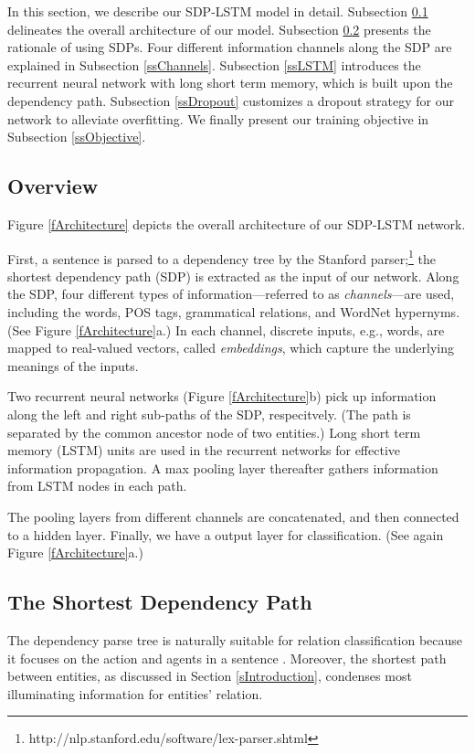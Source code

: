 \documentclass[11pt,a4paper]{article}
\begin{document}
In this section, we describe our SDP-LSTM model in detail.
Subsection \ref{ssOverview} delineates the overall architecture
of our model.
Subsection \ref{ssSDP} presents the rationale of using SDPs.
Four different information channels along
the SDP are explained in Subsection \ref{ssChannels}.
Subsection \ref{ssLSTM} introduces the
recurrent neural network with long short term memory, which
is built upon the dependency path. Subsection \ref{ssDropout} customizes
a dropout strategy for our network to alleviate overfitting.
We finally present our training objective in Subsection \ref{ssObjective}.

\subsection{Overview}\label{ssOverview}

Figure \ref{fArchitecture}
depicts the overall architecture of our SDP-LSTM network.

First, a sentence is parsed to a dependency tree by the Stanford parser;\footnote{
http://nlp.stanford.edu/software/lex-parser.shtml} the shortest dependency path (SDP) is extracted as the input of our network.
Along the SDP, four different types of
information---referred to as \textit{channels}---are used, including the words, POS tags,
grammatical relations, and WordNet hypernyms.
(See Figure \ref{fArchitecture}a.)
In each channel, discrete inputs, e.g., words,
are mapped to real-valued vectors, called
\textit{embeddings}, which capture the underlying
meanings of the inputs.

Two recurrent neural networks (Figure \ref{fArchitecture}b)
pick up information along the left and right
sub-paths of the SDP, respecitvely. (The path is separated by the common ancestor node of two entities.)
Long short term memory (LSTM) units
are used in the recurrent networks
for effective information propagation.
A max pooling layer thereafter gathers information
from LSTM nodes in each path.

The pooling layers from different channels are concatenated,
and then connected to a hidden layer.
Finally, we have a  output layer for classification.
(See again Figure \ref{fArchitecture}a.)

\subsection{The Shortest Dependency Path}\label{ssSDP}

The dependency parse tree is naturally
suitable for relation classification because
it focuses on the action and agents in a sentence \cite{ImageSent}.
Moreover, the shortest path between entities, as discussed in Section \ref{sIntroduction},  condenses most illuminating information for entities' relation.
\end{document}
